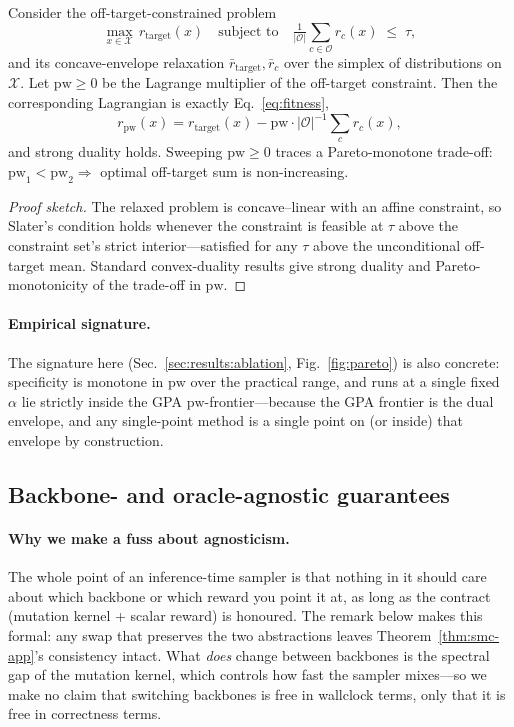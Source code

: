 \begin{proposition}\label{prop:lagr-app}
Consider the off-target-constrained problem
\[
\max_{x\in\mathcal{X}}\,r_{\mathrm{target}}(x)\quad\text{subject to}\quad\tfrac{1}{|\mathcal{O}|}\sum_{c\in\mathcal{O}} r_c(x)\;\leq\;\tau,
\]
and its concave-envelope relaxation $\bar{r}_{\mathrm{target}},\bar r_c$ over the simplex of distributions on $\mathcal{X}$. Let $\mathrm{pw}\!\geq\!0$ be the Lagrange multiplier of the off-target constraint. Then the corresponding Lagrangian is exactly Eq.~\eqref{eq:fitness},
\[
r_{\mathrm{pw}}(x)\!=\!r_{\mathrm{target}}(x)\!-\!\mathrm{pw}\cdot|\mathcal{O}|^{-1}\sum_c r_c(x),
\]
and strong duality holds. Sweeping $\mathrm{pw}\!\geq\!0$ traces a Pareto-monotone trade-off: $\mathrm{pw}_1\!<\!\mathrm{pw}_2\!\Rightarrow$ optimal off-target sum is non-increasing.
\end{proposition}

\begin{proof}[Proof sketch]
The relaxed problem is concave–linear with an affine constraint, so Slater's condition holds whenever the constraint is feasible at $\tau$ above the constraint set's strict interior—satisfied for any $\tau$ above the unconditional off-target mean. Standard convex-duality results \citep[\S5.2]{boyd2004convex} give strong duality and Pareto-monotonicity of the trade-off in $\mathrm{pw}$.
\end{proof}

\paragraph{Empirical signature.}
The signature here (Sec.~\ref{sec:results:ablation}, Fig.~\ref{fig:pareto}) is also concrete: specificity is monotone in $\mathrm{pw}$ over the practical range, and \rerd{} runs at a single fixed $\alpha$ lie strictly inside the GPA $\mathrm{pw}$-frontier—because the GPA frontier is the dual envelope, and any single-point method is a single point on (or inside) that envelope by construction.

\subsection{Backbone- and oracle-agnostic guarantees}\label{app:agnostic}

\paragraph{Why we make a fuss about agnosticism.}
The whole point of an inference-time sampler is that nothing in it should care about which backbone or which reward you point it at, as long as the contract (mutation kernel + scalar reward) is honoured. The remark below makes this formal: any swap that preserves the two abstractions leaves Theorem~\ref{thm:smc-app}'s consistency intact. What \emph{does} change between backbones is the spectral gap of the mutation kernel, which controls how fast the sampler mixes—so we make no claim that switching backbones is free in wallclock terms, only that it is free in correctness terms.

